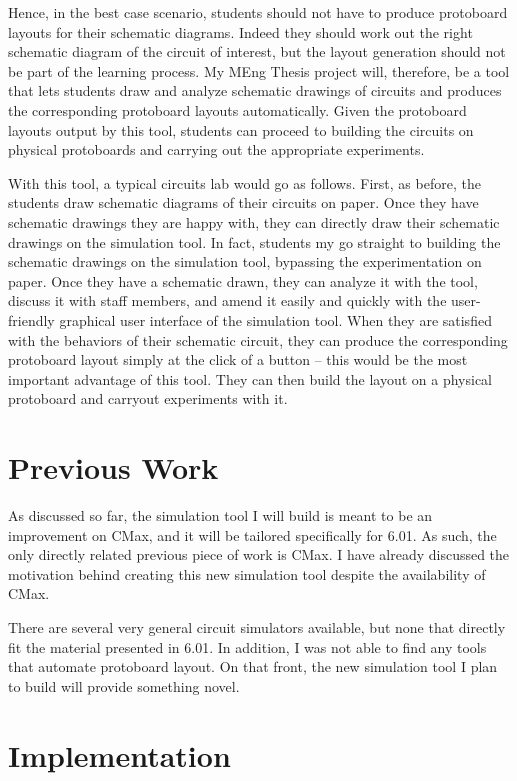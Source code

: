 \documentclass[12pt, doublespacing]{amsart}
\begin{document}
Hence, in the best case scenario, students should not have to produce protoboard layouts for their schematic diagrams. Indeed they should work out the right schematic diagram of the circuit of interest, but the layout generation should not be part of the learning process. My MEng Thesis project will, therefore, be a tool that lets students draw and analyze schematic drawings of circuits and produces the corresponding protoboard layouts automatically. Given the protoboard layouts output by this tool, students can proceed to building the circuits on physical protoboards and carrying out the appropriate experiments.

With this tool, a typical circuits lab would go as follows. First, as before, the students draw schematic diagrams of their circuits on paper. Once they have schematic drawings they are happy with, they can directly draw their schematic drawings on the simulation tool. In fact, students my go straight to building the schematic drawings on the simulation tool, bypassing the experimentation on paper. Once they have a schematic drawn, they can analyze it with the tool, discuss it with staff members, and amend it easily and quickly with the user-friendly graphical user interface of the simulation tool. When they are satisfied with the behaviors of their schematic circuit, they can produce the corresponding protoboard layout simply at the click of a button -- this would be the most important advantage of this tool. They can then build the layout on a physical protoboard and carryout experiments with it.

\section{Previous Work}
\label{sec:previouswork}

As discussed so far, the simulation tool I will build is meant to be an improvement on CMax, and it will be tailored specifically for 6.01. As such, the only directly related previous piece of work is CMax. I have already discussed the motivation behind creating this new simulation tool despite the availability of CMax.

There are several very general circuit simulators available, but none that directly fit the material presented in 6.01. In addition, I was not able to find any tools that automate protoboard layout. On that front, the new simulation tool I plan to build will provide something novel.

\section{Implementation}
\label{sec:implementation}
\end{document}
